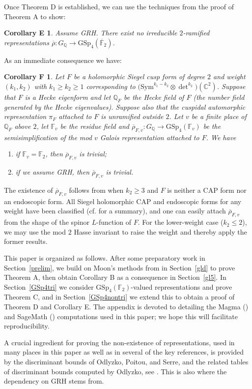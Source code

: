 \documentclass{amsart}
\newtheorem*{corE}{Corollary E}
\newtheorem*{corF}{Corollary F}
\theoremstyle{definition}
\newcommand{\lra}{\longrightarrow}
\newcommand{\C}{\mathbb{C}}
\newcommand{\Q}{\mathbb{Q}}
\newcommand{\F}{\mathbb{F}}
\newcommand{\bF}{\overline{\F}}
\newcommand{\br}{\overline{\rho}}
\newcommand{\GSp}{\mathrm{GSp}}
\newcommand{\Sym}{\mathrm{Sym}}
\renewcommand{\geq}{\geqslant}
\renewcommand{\ge}{\geqslant}
\renewcommand{\le}{\leqslant}
\begin{document}
Once Theorem D is established, we can use the techniques from the proof of Theorem A to show:
\begin{corE}
  Assume GRH.
  There exist no irreducible $2$-ramified representations $\br:G_\Q\lra \GSp_4(\bF_2)$.
\end{corE}

As an immediate consequence we have:
\begin{corF}
  Let $F$ be a holomorphic Siegel cusp form of degree $2$ and weight $(k_1,k_2)$ with $k_1\ge k_2\geq 1$ corresponding to $\big(\Sym^{k_1-k_2}\otimes\det^{k_2}\big)(\C^2)$.
  Suppose that $F$ is a Hecke eigenform and let $\Q_F$ be the Hecke field of $F$ (the number field generated by the Hecke eigenvalues).
  Suppose also that the cuspidal automorphic representation $\pi_F$ attached to $F$ is unramified outside $2$.
  Let $v$ be a finite place of $\Q_F$ above $2$, let $\F_v$ be the residue field and $\br_{F,v}:G_\Q\lra\GSp_4(\F_v)$ be the semisimplification of the mod $v$ Galois representation attached to $F$.
  We have
  \begin{enumerate}
    \item if $\F_v=\F_2$, then $\br_{F,v}$ is trivial;
    \item if we assume GRH, then $\br_{F,v}$ is trivial.
  \end{enumerate}
\end{corF}
The existence of $\br_{F,v}$ follows from \cite{Wei} when $k_2 \ge 3$ and $F$ is neither a CAP form nor an endoscopic form.
All Siegel holomorphic CAP and endoscopic forms for any weight have been classified (cf. \cite[Sections 3.4 and 3.5]{KWY} for a summary), and one can easily attach $\br_{F,v}$ from the shape of the spinor $L$-function of $F$.
For the lower-weight case ($k_2 \le 2$), we may use the mod $2$ Hasse invariant to raise the weight and thereby apply the former results.

This paper is organized as follows.
After some preparatory work in Section~\ref{prelim}, we build on Moon's methods from \cite{Mo1,Mo2} in Section~\ref{gld} to prove Theorem A, then obtain Corollary B as a consequence in Section~\ref{gl5}.
In Section~\ref{GSp4tri} we consider $\GSp_4(\F_2)$-valued representations and prove Theorem C, and in Section~\ref{GSp4nontri} we extend this to obtain a proof of Theorem D and Corollary E.
The appendix is devoted to detailing the Magma (\cite{BCP}) and SageMath (\cite{Sage}) computations used in this paper; we hope this will facilitate reproducibility.

A crucial ingredient for proving the non-existence of representations, used in many places in this paper as well as in several of the key references, is provided by the discriminant bounds of Odlyzko, Poitou, and Serre, and the related tables of discriminant bounds computed by Odlyzko, see \cite{Od}.
This is also where the dependency on GRH stems from.
\end{document}
